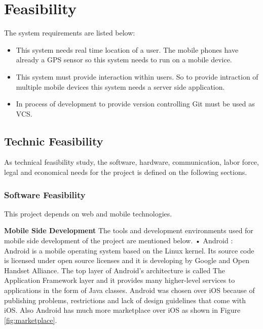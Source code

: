 \chapter{Feasibility}
The system requirements are listed below:
\begin{itemize}
    \item This system needs real time location of a user. The mobile phones have already a GPS sensor so this system needs to run on a mobile device.
    \item This system must provide interaction within users. So to provide intraction of multiple mobile devices this system needs a server side application.
    \item In process of development to provide version controlling Git must be used as VCS.
\end{itemize}

\section{Technic Feasibility}
As technical feasibility study, the software, hardware, communication, labor force, legal and economical needs for the project is defined on the following sections.
\subsection{Software Feasibility}

This project depends on web and mobile technologies.

\textbf{Mobile Side Development}
\newline
The tools and development environments used for mobile side development of the
project are mentioned below.
\newline
• Android \cite{android}: Android is a mobile operating system based on the Linux kernel. Its
source code is licensed under open source licenses and it is developing by Google
and Open Handset Alliance. The top layer of Android’s architecture is called
The Application Framework layer and it provides many higher-level services to
applications in the form of Java classes. Android was chosen over iOS \cite{iOS} because
of publishing problems, restrictions and lack of design guidelines that come with
iOS. Also Android has much more marketplace over iOS as shown in Figure \ref{fig:marketplace}. 

